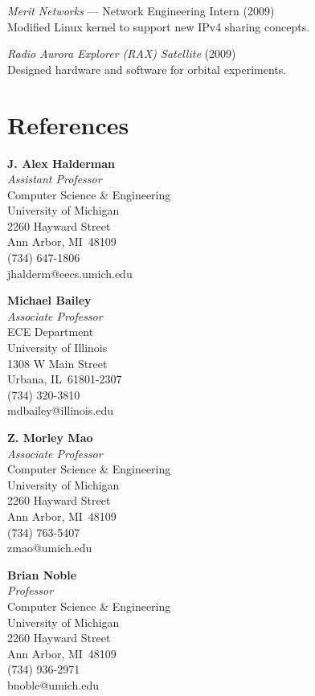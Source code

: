 \documentclass[margin,11pt]{res} %
\begin{document}
    \emph{Merit Networks} --- Network Engineering Intern (2009) \\
    Modified Linux kernel to support new IPv4 sharing concepts.

    \emph{Radio Aurora Explorer (RAX) Satellite} (2009) \\
    Designed hardware and software for orbital experiments.
\fi



\section{\large References}
    
\textbf{J. Alex Halderman}\\
\emph{Assistant Professor}\smallskip\\
Computer Science \& Engineering\\
University of Michigan\\
2260 Hayward Street\\
Ann Arbor, MI \,48109\\
(734) 647-1806\\
jhalderm@eecs.umich.edu
\vspace{6pt}

\textbf{Michael Bailey}\\
    \emph{Associate Professor}\smallskip\\
    {ECE Department\\
    University of Illinois\\
    1308 W Main Street \\
    Urbana, IL \,61801-2307\\
     (734) 320-3810\\
    mdbailey@illinois.edu}
\vspace{6pt}

\textbf{Z. Morley Mao}\\
\emph{Associate Professor}\smallskip\\
Computer Science \& Engineering\\
University of Michigan\\
2260 Hayward Street\\
Ann Arbor, MI \,48109\\
(734) 763-5407\\
zmao@umich.edu
\vspace{6pt}

\textbf{Brian Noble}\\
\emph{Professor}\smallskip\\
Computer Science \& Engineering\\
University of Michigan\\
2260 Hayward Street\\
Ann Arbor, MI \,48109\\
(734) 936-2971\\
bnoble@umich.edu
\vspace{6pt}

\fi
\end{document}
